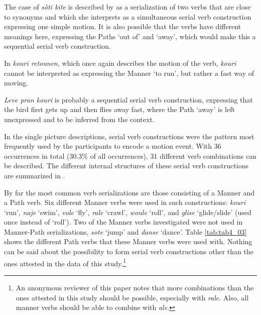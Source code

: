 \documentclass[output=paper,colorlinks,citecolor=brown]{langscibook}
\begin{document}
The case of \emph{sòti kite} is described by \citet[79--81]{BucheliBerger_2009} as a serialization of two verbs that are close to synonyms and which she interprets as a simultaneous serial verb construction expressing one simple motion. It is also possible that the verbs have different meanings here, expressing the Paths ‘out of’ and ‘away’, which would make this a sequential serial verb construction.

In \emph{kouri retounen}, which once again describes the motion of the verb, \emph{kouri} cannot be interpreted as expressing the Manner ‘to run’, but rather a fast way of moving.

\emph{Leve pran kouri} is probably a sequential serial verb construction, expressing that the bird first gets up and then flies away fast, where the Path `away' is left unexpressed and to be inferred from the context.

In the single picture descriptions, serial verb constructions were the pattern most frequently used by the participants to encode a motion event. With 36 occurrences in total (30.3\% of all occurrences), 31 different verb combinations can be described. The different internal structures of these serial verb constructions are summarized in .

\begin{table}[!ht]
\centering
{}
\caption{Frequency of different serial verb constructions in the single picture descriptions}
\label{tab:tab3_03}
\end{table}

By far the most common verb serializations are those consisting of a Manner and a Path verb. Six different Manner verbs were used in such constructions: \emph{kouri} ‘run’, \emph{naje} ‘swim’, \emph{vole} ‘fly’, \emph{rale} ‘crawl’, \emph{woule} ‘roll’, and \emph{glise} ‘glide/slide’ (used once instead of `roll'). Two of the Manner verbs investigated were not used in Manner-Path serializations, \emph{sote} ‘jump’ and \emph{danse} ‘dance’. Table \ref{tab:tab4_03} shows the different Path verbs that these Manner verbs were used with. Nothing can be said about the possibility to form serial verb constructions other than the ones attested in the data of this study.\footnote{An anonymous reviewer of this paper notes that more combinations than the ones attested in this study should be possible, especially with \emph{rale}. Also, all manner verbs should be able to combine with \emph{ale}.}
\end{document}
